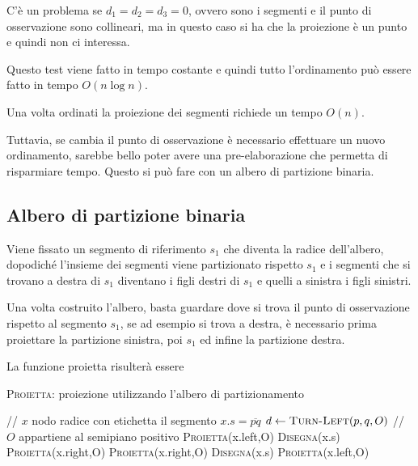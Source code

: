 C'è un problema se $d_1 = d_2 = d_3 =0$, ovvero sono i segmenti e il punto di osservazione sono collineari, ma in questo caso si ha che la proiezione è un punto e quindi non ci interessa.

Questo test viene fatto in tempo costante e quindi tutto l'ordinamento può essere fatto in tempo $O(n \log n)$.

Una volta ordinati la proiezione dei segmenti richiede un tempo $O(n)$.

Tuttavia, se cambia il punto di osservazione è necessario effettuare un nuovo ordinamento, sarebbe bello poter avere una pre-elaborazione che permetta di risparmiare tempo. 
Questo si può fare con un albero di partizione binaria.

\subsection{Albero di partizione binaria}\label{albero-di-partizione-binaria}

Viene fissato un segmento di riferimento $s_1$ che diventa la radice dell'albero, dopodiché l'insieme dei segmenti viene partizionato rispetto $s_1$ e i segmenti che si trovano a destra di $s_1$ diventano i figli destri di $s_1$ e quelli a sinistra i figli sinistri.

Una volta costruito l'albero, basta guardare dove si trova il punto di osservazione rispetto al segmento $s_1$, se ad esempio si trova a
destra, è necessario prima proiettare la partizione sinistra, poi $s_1$ ed infine la partizione destra.

La funzione proietta risulterà essere

\begin{breakablealgorithm}
	\caption{\textsc{Proietta}: proiezione utilizzando l'albero di partizionamento}
	\begin{algorithmic}[1]
        \State // $x$ nodo radice con etichetta il segmento $x.s = \overline{pq}$
        \State $d \gets \textsc{Turn-Left}(p,q,O)$
            \State // $O$ appartiene al semipiano positivo
            \State \textsc{Proietta}(x.left,O)
            \State \textsc{Disegna}(x.s)
            \State \textsc{Proietta}(x.right,O)
        \Else
            \State \textsc{Proietta}(x.right,O)
            \State \textsc{Disegna}(x.s)
            \State \textsc{Proietta}(x.left,O)
        \EndIf 
    \EndIf
\EndFunction
\end{algorithmic}
\end{breakablealgorithm}

